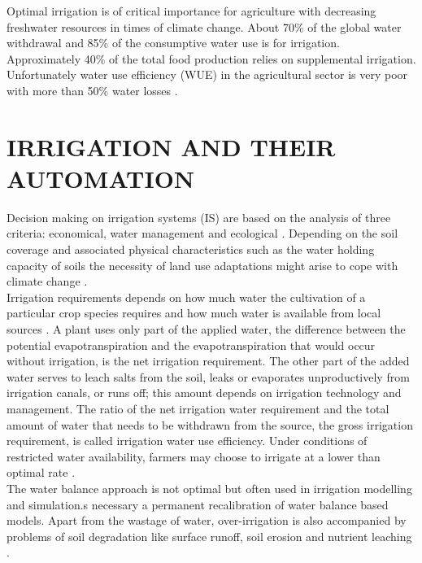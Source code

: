 \documentclass[letterpaper, 10 pt, conference]{ieeeconf}  %
\begin{document}
Optimal irrigation is of critical importance for agriculture with decreasing freshwater resources in times of climate change. About 70\% of the global water withdrawal and 85\% of the consumptive water use is for irrigation. Approximately 40\% of the total food production relies on supplemental irrigation. Unfortunately water use efficiency (WUE) in the agricultural sector is very poor with more than 50\% water losses \cite{Grashey-Jansen2014}.\\



\section{IRRIGATION AND THEIR AUTOMATION}

Decision making on irrigation systems (IS) are based on the analysis of three criteria:  economical, water management and ecological \cite{zhemukhov2016system}. Depending on the soil coverage and associated physical characteristics such as the water holding capacity of soils the necessity of land use adaptations might arise to cope with climate change \cite{riediger2016modelling}.\\ 

Irrigation requirements depends on how much water the cultivation of a particular crop species requires and how much water is available from local sources \cite{riediger2016modelling}. A plant uses only part of the applied water, the difference between the potential evapotranspiration and the evapotranspiration that would occur without irrigation, is the net irrigation requirement. The other part of the added water serves to leach salts from the soil, leaks or evaporates unproductively from irrigation canals, or runs off; this amount depends on irrigation technology and management. The ratio of the net irrigation water requirement and the total amount of water that needs to be withdrawn from the source, the gross irrigation requirement, is called irrigation water use efficiency. Under conditions of restricted water availability, farmers may choose to irrigate at a lower than optimal rate \cite{doll2002impact}.\\

The water balance approach is not optimal but often used in irrigation modelling and simulation.s necessary a permanent recalibration of water balance based models. Apart from the wastage of water, over-irrigation is also accompanied by problems of soil degradation like surface runoff, soil erosion and nutrient leaching \cite{Grashey-Jansen2014}.\\
\end{document}
